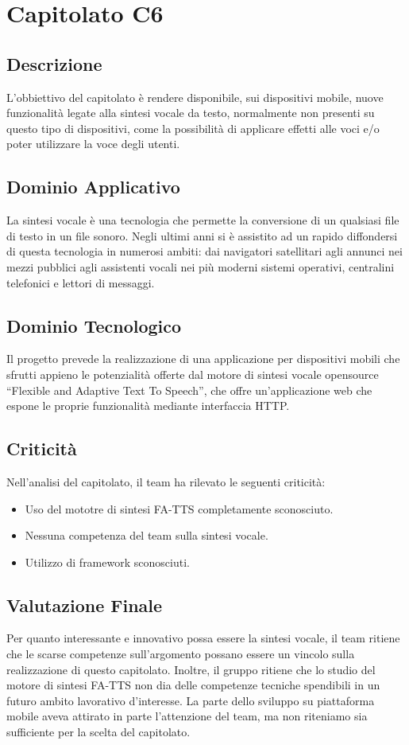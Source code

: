 \section{Capitolato C6}
\subsection{Descrizione}
L’obbiettivo del capitolato è rendere disponibile, sui dispositivi mobile, nuove funzionalità legate alla sintesi vocale da testo, normalmente non presenti su questo tipo di dispositivi, come la possibilità di  applicare effetti alle voci e/o poter utilizzare la voce degli utenti.

\subsection{Dominio Applicativo}
La sintesi vocale è una tecnologia che permette la conversione di un qualsiasi file di testo in un file sonoro. Negli ultimi anni si è assistito ad un rapido diffondersi di questa tecnologia in numerosi ambiti: dai navigatori satellitari agli annunci nei mezzi pubblici agli assistenti vocali nei più moderni sistemi operativi, centralini telefonici e lettori di messaggi.

\subsection{Dominio Tecnologico}
Il progetto prevede la realizzazione di una applicazione per dispositivi mobili che sfrutti appieno le potenzialità offerte dal motore di sintesi vocale opensource “Flexible and Adaptive Text To Speech”, che offre un’applicazione web che espone le proprie funzionalità mediante interfaccia HTTP. 

\subsection{Criticità}
Nell'analisi del capitolato, il team ha rilevato le seguenti criticità:
\begin{itemize}
\item Uso del mototre di sintesi FA-TTS completamente sconosciuto.
\item Nessuna competenza del team sulla sintesi vocale.
\item Utilizzo di framework sconosciuti.
\end{itemize}

\subsection{Valutazione Finale}
Per quanto interessante e innovativo possa essere la sintesi vocale, il team ritiene che le scarse competenze sull’argomento possano essere un vincolo sulla realizzazione di questo capitolato. Inoltre, il gruppo ritiene che lo studio del motore di sintesi FA-TTS non dia delle competenze tecniche spendibili in un futuro ambito lavorativo d’interesse.
La parte dello sviluppo su piattaforma mobile aveva attirato in parte l’attenzione del team, ma non riteniamo sia sufficiente per la scelta del capitolato.
